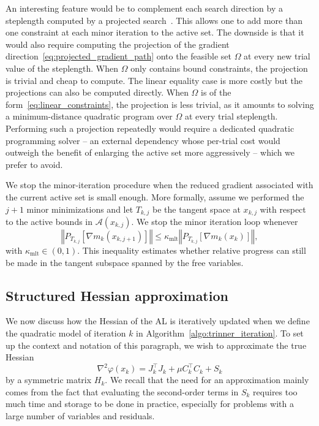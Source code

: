 \documentclass[pdflatex,sn-mathphys-num]{sn-jnl}%
\theoremstyle{thmstyleone}%
\newcommand{\calA}{{\mathcal{A}}}
\newcommand{\proj}[2]{P_{#1} \left[ {#2} \right]} %
\begin{document}
An interesting feature would be to complement each search direction by a steplength computed by a projected search~\cite{moretoraldo:1991,linmore:1999a}. This allows one to add more than one constraint at each minor iteration to the active set. The downside is that it would also require computing the projection of the gradient direction~\eqref{eq:projected_gradient_path} onto the feasible set $\Omega$ at every new trial value of the steplength. When $\Omega$ only contains bound constraints, the projection is trivial and cheap to compute. The linear equality case is more costly but the projections can also be computed directly. When $\Omega$ is of the form~\eqref{eq:linear_constraints}, the projection is less trivial, as it amounts to solving a minimum-distance quadratic program over $\Omega$ at every trial steplength. Performing such a projection repeatedly would require a dedicated quadratic programming solver -- an external dependency whose per-trial cost would outweigh the benefit of enlarging the active set more aggressively -- which we prefer to avoid.

We stop the minor-iteration procedure when the reduced gradient associated with the current active set is small enough. More formally, assume we performed the $j+1$ minor minimizations and let $T_{k,j}$ be the tangent space at $x_{k,j}$ with respect to the active bounds in $\calA(x_{k,j})$. We stop the minor iteration loop whenever
\begin{equation*}
	\left\Vert \proj{T_{k,j}}{\nabla m_k(x_{k,j+1})} \right\Vert \le \kappa_{\mathrm{mlt}} \left\Vert \proj{T_{k,j}}{\nabla m_k(x_k)}\right\Vert,
\end{equation*}
with $\kappa_{\mathrm{mlt}} \in (0,1)$. This inequality estimates whether relative progress can still be made in the tangent subspace spanned by the free variables. 

\subsection{Structured Hessian approximation}\label{subsec:hessian_approx}

We now discuss how the Hessian of the AL is iteratively updated when we define the quadratic model of iteration $k$ in Algorithm~\ref{algo:trinner_iteration}. To set up the context and notation of this paragraph, we wish to approximate the true Hessian
\[\nabla^2 \varphi(x_k) = J_k^\top J_k + \mu C_k^\top C_k + S_k\]  
by a symmetric matrix $H_k$.
We recall that the need for an approximation mainly comes from the fact that evaluating the second-order terms in $S_k$ requires too much time and storage to be done in practice, especially for problems with a large number of variables and residuals.
\end{document}
